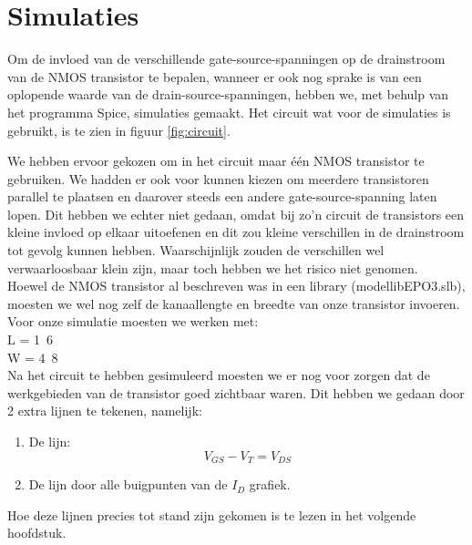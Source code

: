 \documentclass{scrartcl}  %
\begin{document}
\section{Simulaties}
Om de invloed van de verschillende gate-source-spanningen op de drainstroom van de NMOS transistor te bepalen, wanneer er ook nog sprake is van een oplopende waarde van de drain-source-spanningen, hebben we, met behulp van het programma Spice, simulaties gemaakt. 
Het circuit wat voor de simulaties is gebruikt, is te zien in figuur \ref{fig:circuit}. 

We hebben ervoor gekozen om in het circuit maar één NMOS transistor te gebruiken. 
We hadden er ook voor kunnen kiezen om meerdere transistoren parallel te plaatsen en daarover steeds een andere gate-source-spanning laten lopen. 
Dit hebben we echter niet gedaan, omdat bij zo'n circuit de transistors een kleine invloed op elkaar uitoefenen en dit zou kleine verschillen in de drainstroom tot gevolg kunnen hebben. 
Waarschijnlijk zouden de verschillen wel verwaarloosbaar klein zijn, maar toch hebben we het risico niet genomen. 
\\
Hoewel de NMOS transistor al beschreven was in een library (modellibEPO3.slb), moesten we wel nog zelf de kanaallengte en breedte van onze transistor invoeren. 
Voor onze simulatie moesten we werken met: \\
L = \unit{1.6}{\micro\meter} \\
W = \unit{4.8}{\micro\meter} \\
Na het circuit te hebben gesimuleerd moesten we er nog voor zorgen dat de werkgebieden van de transistor goed zichtbaar waren. 
Dit hebben we gedaan door 2 extra lijnen te tekenen, namelijk: 
\begin{enumerate}
	\item De lijn: 
\begin{equation}
V_{GS} - V_{T} = V_{DS} 
\end{equation}
	\item De lijn door alle buigpunten van de $I_{D}$ grafiek.
\end{enumerate}
Hoe deze lijnen precies tot stand zijn gekomen is te lezen in het volgende hoofdstuk. 
\end{document}
